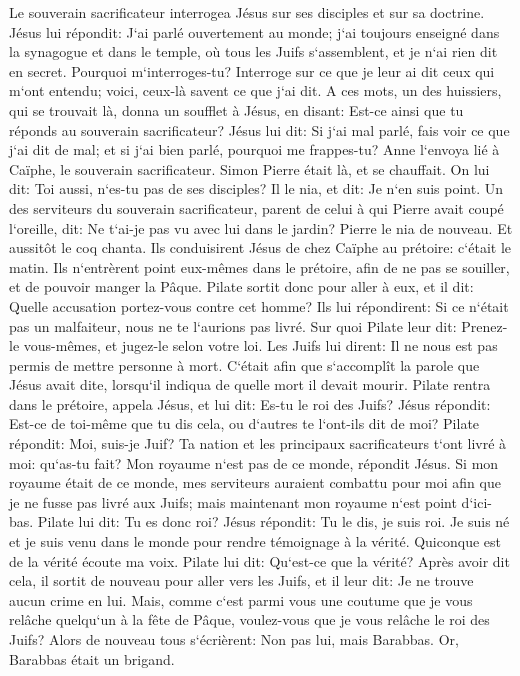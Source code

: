 \verse Le souverain sacrificateur interrogea Jésus sur ses disciples et sur sa doctrine. 
\verse Jésus lui répondit: J`ai parlé ouvertement au monde; j`ai toujours enseigné dans la synagogue et dans le temple, où tous les Juifs s`assemblent, et je n`ai rien dit en secret. 
\verse Pourquoi m`interroges-tu? Interroge sur ce que je leur ai dit ceux qui m`ont entendu; voici, ceux-là savent ce que j`ai dit. 
\verse A ces mots, un des huissiers, qui se trouvait là, donna un soufflet à Jésus, en disant: Est-ce ainsi que tu réponds au souverain sacrificateur? 
\verse Jésus lui dit: Si j`ai mal parlé, fais voir ce que j`ai dit de mal; et si j`ai bien parlé, pourquoi me frappes-tu? 
\verse Anne l`envoya lié à Caïphe, le souverain sacrificateur. 
\verse Simon Pierre était là, et se chauffait. On lui dit: Toi aussi, n`es-tu pas de ses disciples? Il le nia, et dit: Je n`en suis point. 
\verse Un des serviteurs du souverain sacrificateur, parent de celui à qui Pierre avait coupé l`oreille, dit: Ne t`ai-je pas vu avec lui dans le jardin? 
\verse Pierre le nia de nouveau. Et aussitôt le coq chanta. 
\verse Ils conduisirent Jésus de chez Caïphe au prétoire: c`était le matin. Ils n`entrèrent point eux-mêmes dans le prétoire, afin de ne pas se souiller, et de pouvoir manger la Pâque. 
\verse Pilate sortit donc pour aller à eux, et il dit: Quelle accusation portez-vous contre cet homme? 
\verse Ils lui répondirent: Si ce n`était pas un malfaiteur, nous ne te l`aurions pas livré. 
\verse Sur quoi Pilate leur dit: Prenez-le vous-mêmes, et jugez-le selon votre loi. Les Juifs lui dirent: Il ne nous est pas permis de mettre personne à mort. 
\verse C`était afin que s`accomplît la parole que Jésus avait dite, lorsqu`il indiqua de quelle mort il devait mourir. 
\verse Pilate rentra dans le prétoire, appela Jésus, et lui dit: Es-tu le roi des Juifs? 
\verse Jésus répondit: Est-ce de toi-même que tu dis cela, ou d`autres te l`ont-ils dit de moi? 
\verse Pilate répondit: Moi, suis-je Juif? Ta nation et les principaux sacrificateurs t`ont livré à moi: qu`as-tu fait? 
\verse Mon royaume n`est pas de ce monde, répondit Jésus. Si mon royaume était de ce monde, mes serviteurs auraient combattu pour moi afin que je ne fusse pas livré aux Juifs; mais maintenant mon royaume n`est point d`ici-bas. 
\verse Pilate lui dit: Tu es donc roi? Jésus répondit: Tu le dis, je suis roi. Je suis né et je suis venu dans le monde pour rendre témoignage à la vérité. Quiconque est de la vérité écoute ma voix. 
\verse Pilate lui dit: Qu`est-ce que la vérité? Après avoir dit cela, il sortit de nouveau pour aller vers les Juifs, et il leur dit: Je ne trouve aucun crime en lui. 
\verse Mais, comme c`est parmi vous une coutume que je vous relâche quelqu`un à la fête de Pâque, voulez-vous que je vous relâche le roi des Juifs? 
\verse Alors de nouveau tous s`écrièrent: Non pas lui, mais Barabbas. Or, Barabbas était un brigand. 


